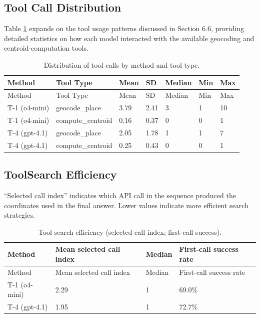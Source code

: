 \subsection{Tool Call
Distribution}\label{d.4-tool-call-distribution}

Table \ref{tbl:tool_distribution} expands on the tool usage patterns
discussed in Section 6.6, providing detailed statistics on how each
model interacted with the available geocoding and centroid-computation
tools.

\begin{longtable}[]{@{}lllllll@{}}
\caption{\label{tbl:tool_distribution}Distribution of tool calls by
method and tool type.}\tabularnewline
\toprule\noalign{}
Method & Tool Type & Mean & SD & Median & Min & Max \\
\midrule\noalign{}
\endfirsthead
\toprule\noalign{}
Method & Tool Type & Mean & SD & Median & Min & Max \\
\midrule\noalign{}
\endhead
\bottomrule\noalign{}
\endlastfoot
T-1 (o4-mini) & geocode\_place & 3.79 & 2.41 & 3 & 1 & 10 \\
T-1 (o4-mini) & compute\_centroid & 0.16 & 0.37 & 0 & 0 & 1 \\
T-4 (gpt-4.1) & geocode\_place & 2.05 & 1.78 & 1 & 1 & 7 \\
T-4 (gpt-4.1) & compute\_centroid & 0.25 & 0.43 & 0 & 0 & 1 \\
\end{longtable}

\subsection{ToolSearch
Efficiency}\label{d.5-toolsearch-efficiency}

``Selected call index'' indicates which API call in the sequence
produced the coordinates used in the final answer. Lower values indicate
more efficient search strategies.

\begin{longtable}[]{@{}llll@{}}
\caption{\label{tbl:search_efficiency}Tool search efficiency
(selected‑call index; first‑call success).}\tabularnewline
\toprule\noalign{}
Method & Mean selected call index & Median & First-call success rate \\
\midrule\noalign{}
\endfirsthead
\toprule\noalign{}
Method & Mean selected call index & Median & First-call success rate \\
\midrule\noalign{}
\endhead
\bottomrule\noalign{}
\endlastfoot
T-1 (o4-mini) & 2.29 & 1 & 69.0\% \\
T-4 (gpt-4.1) & 1.95 & 1 & 72.7\% \\
\end{longtable}

